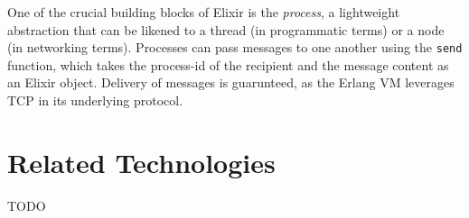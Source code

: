 One of the crucial building blocks of Elixir is the \emph{process}, a lightweight abstraction that can be likened to
a thread (in programmatic terms) or a node (in networking terms)\cite{elixir_processes}. Processes can pass messages
to one another using the \texttt{send} function, which takes the process-id of the recipient and the message content as
an Elixir object. Delivery of messages is guarunteed, as the Erlang VM leverages TCP in its underlying
protocol\cite{erlang_protocol}.


\section{Related Technologies}

TODO
